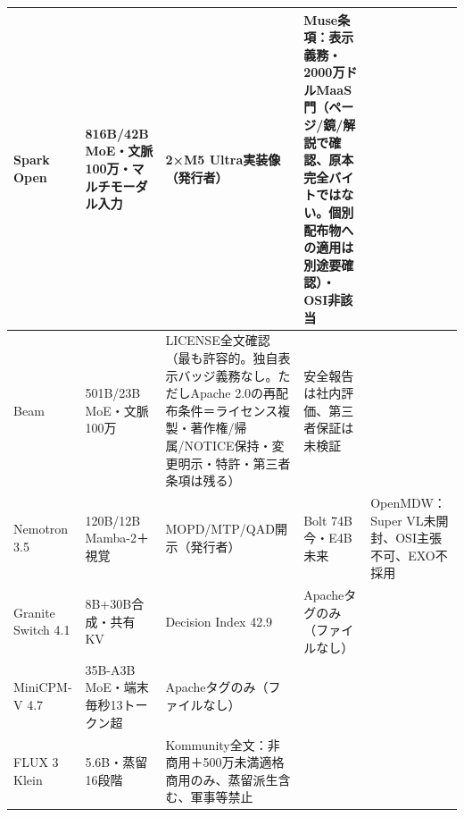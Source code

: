 \documentclass[lualatex,a4paper,10pt]{jlreq}
\begin{document}
{\centering\footnotesize
{}
\begin{tabularx}{0.96\linewidth}{@{}lXXXX@{}}
\toprule
Spark Open & 816B/42B MoE・文脈100万・マルチモーダル入力 & 2×M5 Ultra実装像（発行者） & Muse条項：表示義務・2000万ドルMaaS門（ページ/鏡/解説で確認、原本完全バイトではない。個別配布物への適用は別途要確認）・OSI非該当 \cite{B14,B70,B15,B13} \\
\midrule
Beam & 501B/23B MoE・文脈100万 & LICENSE全文確認（最も許容的。独自表示バッジ義務なし。ただしApache 2.0の再配布条件＝ライセンス複製・著作権/帰属/NOTICE保持・変更明示・特許・第三者条項は残る） & 安全報告は社内評価、第三者保証は未検証 \cite{B17,B19,B18,B16} \\
\midrule
Nemotron 3.5 & 120B/12B Mamba-2＋視覚 & MOPD/MTP/QAD開示（発行者） & Bolt 74B今・E4B未来 & OpenMDW：Super VL未開封、OSI主張不可、EXO不採用 \cite{B21,B72,B22,B20} \\
\midrule
Granite Switch 4.1 & 8B+30B合成・共有KV & Decision Index 42.9 & Apacheタグのみ（ファイルなし） \cite{B24,B73,B23,B25} \\
\midrule
MiniCPM-V 4.7 & 35B-A3B MoE・端末毎秒13トークン超 & Apacheタグのみ（ファイルなし） \cite{B27,B74,B26} \\
\midrule
FLUX 3 Klein & 5.6B・蒸留16段階 & Kommunity全文：非商用＋500万未満適格商用のみ、蒸留派生含む、軍事等禁止 \cite{B29,B28,B30} \\
\bottomrule
\end{tabularx}
} %
\end{document}
